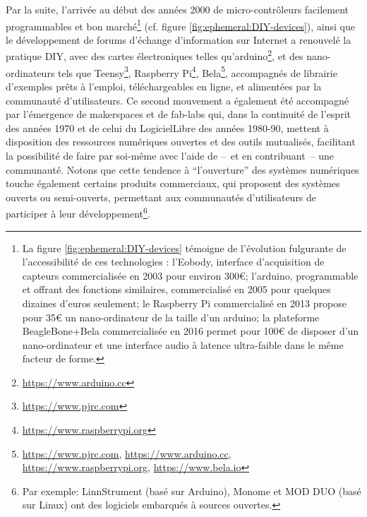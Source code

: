 \indent Par la suite, l'arrivée au début des années 2000 de micro-contrôleurs facilement programmables et bon marché\footnote{La figure \ref{fig:ephemeral:DIY-devices} témoigne de l'évolution fulgurante de l'accessibilité de ces technologies : l'Eobody, interface d'acquisition de capteurs commercialisée en 2003 pour environ 300€; l'arduino, programmable et offrant des fonctions similaires, commercialisé en 2005 pour quelques dizaines d'euros seulement; le Raspberry Pi commercialisé en 2013 propose pour 35€ un nano-ordinateur de la taille d'un arduino; la plateforme BeagleBone+Bela commercialisée en 2016 permet pour 100€ de disposer d'un nano-ordinateur et une interface audio à latence ultra-faible dans le même facteur de forme.} (cf. figure \ref{fig:ephemeral:DIY-devices}), ainsi que le développement de forums d'échange d'information sur Internet a renouvelé la pratique \gls{DIY}, avec des cartes électroniques telles qu'arduino\footnote{\url{https://www.arduino.cc}}, et des nano-ordinateurs tels que Teensy\footnote{\url{https://www.pjrc.com}}, Raspberry Pi\footnote{\url{https://www.raspberrypi.org}}, Bela\footnote{\url{https://www.pjrc.com}, \url{https://www.arduino.cc}, \url{https://www.raspberrypi.org}, \url{https://www.bela.io}}, accompagnés de librairie d'exemples prêts à l'emploi, téléchargeables en ligne, et alimentées par la communauté d'utilisateurs. Ce second mouvement a également été accompagné par l'émergence de \glspl{makerspace} et de \glspl{fab-lab} qui, dans la continuité de l'esprit des années 1970 et de celui du \gls{LogicielLibre} des années 1980-90, mettent à disposition des ressources numériques ouvertes et des outils mutualisés, facilitant la possibilité de faire par soi-même avec l'aide de --~et en contribuant~-- une communauté. Notons que cette tendence à ``l'ouverture'' des systèmes numériques touche également certains produits commerciaux, qui proposent des systèmes ouverts ou semi-ouverts, permettant aux communautés d'utilisateurs de participer à leur développement\footnote{Par exemple: LinnStrument (basé sur Arduino), Monome et MOD DUO (basé sur Linux) ont des logiciels embarqués à sources ouvertes.}.\\

